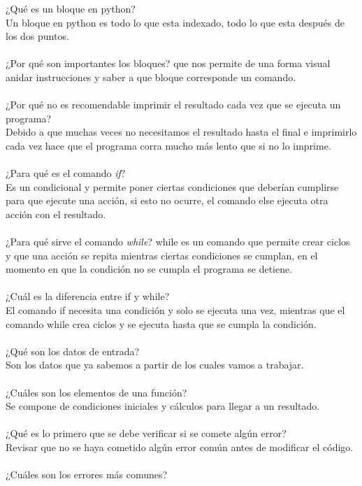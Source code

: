 \documentclass{article}
\begin{document}
¿Qué es un bloque en python?\\
Un bloque en python es todo lo que esta indexado, todo lo que esta después de los dos puntos.\\
\\
¿Por qué son importantes los bloques?
que nos permite de una forma visual anidar instrucciones y saber a que bloque corresponde un comando.\\
\\
¿Por qué no es recomendable imprimir el resultado cada vez que se ejecuta un programa?\\
Debido a que muchas veces no necesitamos el resultado hasta el final e imprimirlo cada vez hace que el programa corra mucho más lento que si no lo imprime.\\
\\
¿Para qué es el comando \textit{if}?\\
Es un condicional y permite poner ciertas condiciones que deberían cumplirse para que ejecute una acción, si esto no ocurre, el comando else ejecuta otra acción con el resultado.\\
\\
¿Para qué sirve el comando \textit{while}?
while es un comando que permite crear ciclos y que una acción se repita mientras ciertas condiciones se cumplan, en el momento en que la condición no se cumpla el programa se detiene.\\
\\
¿Cuál es la diferencia entre if y while?\\
El comando if necesita una condición y solo se ejecuta una vez, mientras que el comando while crea ciclos y se ejecuta hasta que se cumpla la condición.\\
\\
¿Qué son los datos de entrada?\\
Son los datos que ya sabemos a partir de los cuales vamos a trabajar.\\
\\
¿Cuáles son los elementos de una función?\\
Se compone de condiciones iniciales y cálculos para llegar a un resultado.\\
\\
¿Qué es lo primero que se debe verificar si se comete algún error?\\
Revisar que no se haya cometido algún error común antes de modificar el código.\\
\\
¿Cuáles son los errores más comunes?\\
\end{document}
